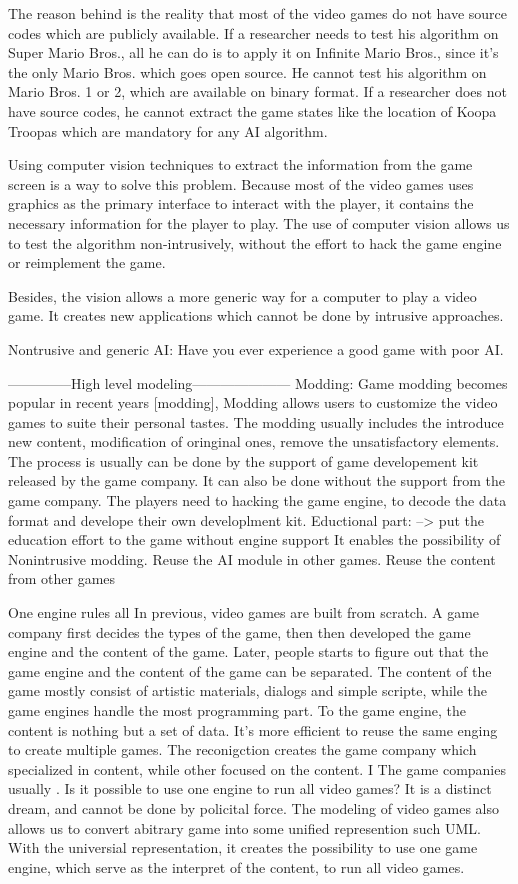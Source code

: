 The reason behind is the reality that most of the video games do not have source codes which are publicly available.
If a researcher needs to test his algorithm on Super Mario Bros., all he can do is to apply it on Infinite Mario Bros.,
since it's the only Mario Bros. which goes open source. He cannot test his algorithm on Mario Bros. 1 or 2, which are available
on binary format. If a researcher does not have source codes, he cannot extract the game states like the location
of Koopa Troopas which are mandatory for any AI algorithm. 

Using computer vision techniques to extract the information from the game screen is a way to solve this problem.
Because most of the video games uses graphics as the primary interface to interact with the player, it contains
the necessary information for the player to play. The use of computer vision allows us to test the algorithm
non-intrusively, without the effort to hack the game engine or reimplement the game.

Besides, the vision allows a more generic way for a computer to play a video game. It creates 
new applications which cannot be done by intrusive approaches.

Nontrusive and generic AI:
Have you ever experience a good game with poor AI.

--------------High level modeling---------------------
Modding: 
Game modding becomes popular in recent years [modding], 
Modding allows users to customize the video games to suite their personal tastes.
The modding usually includes the introduce new content, modification of oringinal ones, remove the unsatisfactory elements.
The process is usually can be done by the support of game developement kit released by the game company.
It can also be done without the support from the game company. The players need to hacking the game engine,
to decode the data format and develope their own developlment kit. 
Eductional part: --> put the education effort to the game without engine support
It enables the possibility of Nonintrusive modding.
Reuse the AI module in other games. Reuse the content from other games

One engine rules all
In previous, video games are built from scratch. A game company first decides the types of the game,
then then developed the game engine and the content of the game. Later, people starts to figure out 
that the game engine and the content of the game can be separated. The content of the game mostly consist of
artistic materials, dialogs and simple scripte, while the game engines handle the most programming part.
To the game engine, the content is nothing but a set of data. It's more efficient to reuse the same enging
to create multiple games. The reconigction creates the game company which specialized in content, while other
focused on the content. I 
The game companies usually .
Is it possible to use one engine to run all video games?
It is a distinct dream, and cannot be done by policital force.
The modeling of video games also allows us to convert abitrary game into
some unified represention such UML. 
With the universial representation,
it creates the possibility to use one game engine, which serve as the interpret of the content, to run all video games.


